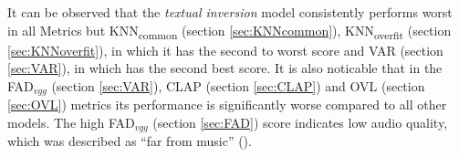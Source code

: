 \documentclass[a4paper,12pt,twoside]{article}
\begin{document}
\begin{table}[!h]
    \caption{Original experimental results regarding audio and conditioning quality as well as prompt following (\cite{rouardAudioConditioningMusic2024})}
    \label{tab:comparison_baselines}
    \centering
\end{table}

It can be observed that the \textit{textual inversion} model consistently performs worst in all Metrics but KNN\textsubscript{common} (section \ref{sec:KNNcommon}), KNN\textsubscript{overfit} (section \ref{sec:KNNoverfit}), in which it has the second to worst score and VAR (section \ref{sec:VAR}), in which has the second best score. It is also noticable that in the FAD$_{vgg}$ (section \ref{sec:VAR}), CLAP (section \ref{sec:CLAP}) and OVL (section \ref{sec:OVL}) metrics its performance is significantly worse compared to all other models. The high FAD$_{vgg}$ (section \ref{sec:FAD}) score indicates low audio quality, which was described as ``far from music'' (\cite{rouardAudioConditioningMusic2024}). \\ \
\end{document}
